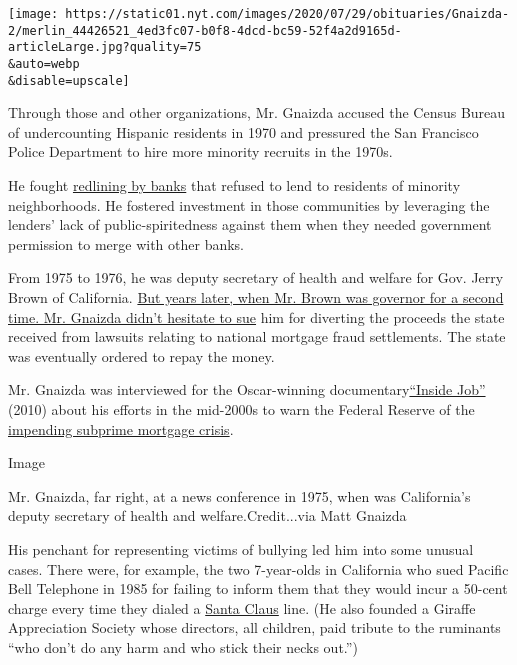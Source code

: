 \texttt{[image: https://static01.nyt.com/images/2020/07/29/obituaries/Gnaizda-2/merlin\_44426521\_4ed3fc07-b0f8-4dcd-bc59-52f4a2d9165d-articleLarge.jpg?quality=75\\\&auto=webp\\\&disable=upscale]}

Through those and other organizations, Mr. Gnaizda accused the Census
Bureau of undercounting Hispanic residents in 1970 and pressured the San
Francisco Police Department to hire more minority recruits in the 1970s.

He fought
\href{https://www.nytimes.com/2017/08/24/upshot/how-redlinings-racist-effects-lasted-for-decades.html}{redlining
by banks} that refused to lend to residents of minority neighborhoods.
He fostered investment in those communities by leveraging the lenders'
lack of public-spiritedness against them when they needed government
permission to merge with other banks.

From 1975 to 1976, he was deputy secretary of health and welfare for
Gov. Jerry Brown of California.
\href{https://www.nytimes.com/2014/03/15/business/california-sued-over-diversion-of-money-from-national-mortgage-settlement.html}{But
years later, when Mr. Brown was governor for a second time. Mr. Gnaizda
didn't hesitate to sue} him for diverting the proceeds the state
received from lawsuits relating to national mortgage fraud settlements.
The state was eventually ordered to repay the money.

Mr. Gnaizda was interviewed for the Oscar-winning
documentary\href{https://www.nytimes.com/2010/10/08/movies/08inside.html}{``Inside
Job''} (2010) about his efforts in the mid-2000s to warn the Federal
Reserve of the
\href{https://www.nytimes.com/2007/12/18/business/18subprime.html}{impending
subprime mortgage crisis}.

Image

Mr. Gnaizda, far right, at a news conference in 1975, when was
California's deputy secretary of health and welfare.Credit...via Matt
Gnaizda

His penchant for representing victims of bullying led him into some
unusual cases. There were, for example, the two 7-year-olds in
California who sued Pacific Bell Telephone in 1985 for failing to inform
them that they would incur a 50-cent charge every time they dialed a
\href{https://www.nytimes.com/1985/03/28/us/around-the-nation-santa-claus-phone-line-brings-10-million-suit.html}{Santa
Claus} line. (He also founded a Giraffe Appreciation Society whose
directors, all children, paid tribute to the ruminants ``who don't do
any harm and who stick their necks out.'')


